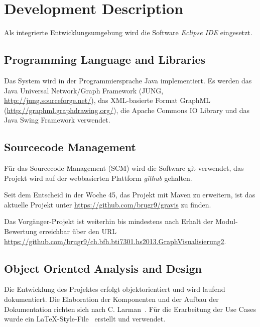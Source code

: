 \section{Development Description}
\label{sec:Development Description}
% 
Als integrierte Entwicklungsumgebung wird die Software \textit{Eclipse IDE} eingesetzt.
% 
\subsection{Programming Language and Libraries}
\label{subsec:Programming Language and Libraries}
Das System wird in der Programmiersprache Java implementiert. Es werden das Java Universal Network/Graph Framework (JUNG, \url{http://jung.sourceforge.net/}), das XML-basierte Format GraphML (\url{http://graphml.graphdrawing.org/}), die Apache Commons IO Library und das Java Swing Framework verwendet.
% 
\subsection{Sourcecode Management}
\label{subsec:Sourcecode Management}
F\"ur das Sourcecode Management (SCM) wird die Software git verwendet, das Projekt wird auf der webbasierten Plattform \textit{github} gehalten.

Seit dem Entscheid in der Woche 45, das Projekt mit Maven zu erweitern, ist das aktuelle Projekt unter \url{https://github.com/brugr9/gravis} zu finden.

Das Vorg\"anger-Projekt ist weiterhin bis mindestens nach Erhalt der Modul-Bewertung erreichbar \"uber den URL \url{https://github.com/brugr9/ch.bfh.bti7301.hs2013.GraphVisualisierung2}.
% 
\subsection{Object Oriented Analysis and Design}
\label{subsec:Object Oriented Analysis and Design}
Die Entwicklung des Projektes erfolgt objektorientiert und wird laufend dokumentiert. Die Elaboration der Komponenten und der Aufbau der Dokumentation richten sich nach C. Larman~\cite{larmann:2004}. F\"ur die Erarbeitung der Use Cases wurde ein \LaTeX-Style-File~\cite{bruggmann:2013} erstellt und verwendet.